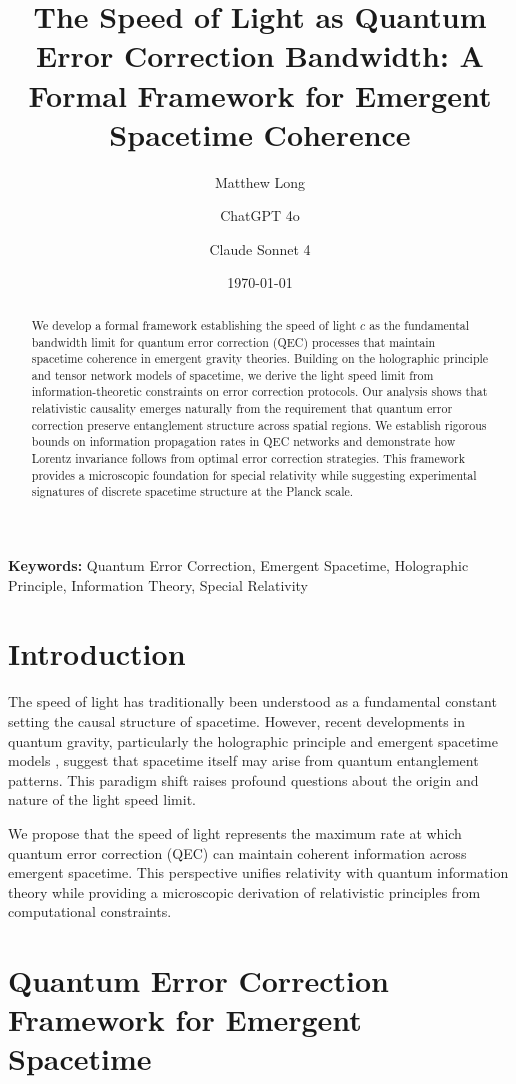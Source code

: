 \documentclass[12pt]{article}
\title{The Speed of Light as Quantum Error Correction Bandwidth: A Formal Framework for Emergent Spacetime Coherence}
\author[1]{Matthew Long}
\author[2]{ChatGPT 4o}
\author[3]{Claude Sonnet 4}
\affil[1]{Yoneda AI}
\affil[2]{OpenAI}
\affil[3]{Anthropic}
\date{\today}
\newcommand{\keywords}[1]{\vspace{1em}\noindent\textbf{Keywords:} #1}
\begin{document}
\maketitle

\begin{abstract}
We develop a formal framework establishing the speed of light $c$ as the fundamental bandwidth limit for quantum error correction (QEC) processes that maintain spacetime coherence in emergent gravity theories. Building on the holographic principle and tensor network models of spacetime, we derive the light speed limit from information-theoretic constraints on error correction protocols. Our analysis shows that relativistic causality emerges naturally from the requirement that quantum error correction preserve entanglement structure across spatial regions. We establish rigorous bounds on information propagation rates in QEC networks and demonstrate how Lorentz invariance follows from optimal error correction strategies. This framework provides a microscopic foundation for special relativity while suggesting experimental signatures of discrete spacetime structure at the Planck scale.
\end{abstract}

\keywords{Quantum Error Correction, Emergent Spacetime, Holographic Principle, Information Theory, Special Relativity}

\onehalfspacing

\section{Introduction}

The speed of light has traditionally been understood as a fundamental constant setting the causal structure of spacetime. However, recent developments in quantum gravity, particularly the holographic principle \cite{Susskind1995} and emergent spacetime models \cite{VanRaamsdonk2010, Ryu2006}, suggest that spacetime itself may arise from quantum entanglement patterns. This paradigm shift raises profound questions about the origin and nature of the light speed limit.

We propose that the speed of light represents the maximum rate at which quantum error correction (QEC) can maintain coherent information across emergent spacetime. This perspective unifies relativity with quantum information theory while providing a microscopic derivation of relativistic principles from computational constraints.

\section{Quantum Error Correction Framework for Emergent Spacetime}
\end{document}
